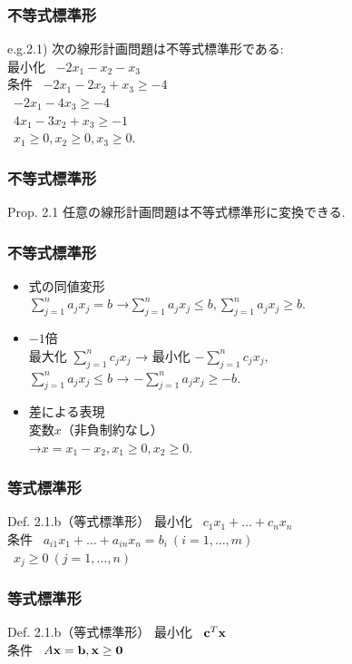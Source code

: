 \documentclass[unicode, 12pt, aspectratio = 43]{beamer}
\begin{document}
\begin{frame}[fragile]
	\frametitle{不等式標準形}
	e.g.2.1) 次の線形計画問題は不等式標準形である: \\
	最小化 \ $-2x_1 - x_2 - x_3$ \\
	条件 \ $-2x_1 - 2x_2 + x_3 \ge -4$ \\
	\   $-2x_1 - 4x_3 \ge -4$ \\
	\   $4x_1 - 3x_2 + x_3 \ge -1$ \\
	\   $x_1 \ge 0, x_2 \ge 0, x_3 \ge 0.$
\end{frame}

\begin{frame}[fragile]
	\frametitle{不等式標準形}
	\begin{itembox}[l]{Prop. 2.1}
		任意の線形計画問題は不等式標準形に変換できる.
	\end{itembox}
\end{frame}

\begin{frame}[fragile]
	\frametitle{不等式標準形}
	\begin{itemize}
		\item 式の同値変形 \\
		$\displaystyle \sum_{j=1}^n a_j x_j = b$
		→$\displaystyle \sum_{j=1}^n a_j x_j \le b, \sum_{j=1}^n a_j x_j \ge b.$
		\item $-1$倍 \\
		最大化 $\displaystyle \sum_{j=1}^n c_j x_j$ → 最小化 $\displaystyle -\sum_{j=1}^n c_j x_j, $ \\
		$\displaystyle \sum_{j=1}^n a_j x_j \le b$ → $\displaystyle -\sum_{j=1}^n a_j x_j \ge -b.$
		\item 差による表現 \\
		変数$x$（非負制約なし） \\
		→$x = x_1 - x_2, x_1 \ge 0, x_2 \ge 0.$
	\end{itemize}
\end{frame}

\begin{frame}[fragile]
	\frametitle{等式標準形}
	\begin{itembox}[l]{Def. 2.1.b（等式標準形）}
		最小化 \ $c_1x_1+ \dots+ c_nx_n$ \\
		条件 \ $a_{i1}x_1 + \dots+ a_{in}x_n = b_i \ (i = 1, \dots, m)$ \\
		\   $x_j \ge 0 \ (j = 1, \dots, n)$
	\end{itembox}
\end{frame}

\begin{frame}[fragile]
	\frametitle{等式標準形}
	\begin{itembox}[l]{Def. 2.1.b（等式標準形）}
		最小化 \ ${\bf c}^T {\bf x}$ \\
		条件 \ $A{\bf x} = {\bf b}, {\bf x} \ge {\bf 0}$
	\end{itembox}
\end{frame}
\end{document}
